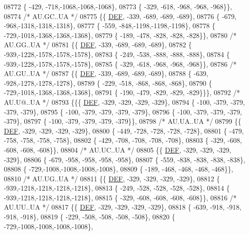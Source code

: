 \begin{DoxyCode}
08772 \{ -429, -718,-1068,-1068,-1068\},
08773 \{ -329, -618, -968, -968, -968\}\},
08774 \textcolor{comment}{/* AU.GC..UA */}
08775 \{\{  \mbox{\hyperlink{1_88_84__epars_8h_a397419fc12b37ed479c8abb9d444d843}{DEF}}, -339, -689, -689, -689\},
08776 \{ -679, -968,-1318,-1318,-1318\},
08777 \{ -559, -848,-1198,-1198,-1198\},
08778 \{ -729,-1018,-1368,-1368,-1368\},
08779 \{ -189, -478, -828, -828, -828\}\},
08780 \textcolor{comment}{/* AU.GG..UA */}
08781 \{\{  \mbox{\hyperlink{1_88_84__epars_8h_a397419fc12b37ed479c8abb9d444d843}{DEF}}, -339, -689, -689, -689\},
08782 \{ -939,-1228,-1578,-1578,-1578\},
08783 \{ -249, -538, -888, -888, -888\},
08784 \{ -939,-1228,-1578,-1578,-1578\},
08785 \{ -329, -618, -968, -968, -968\}\},
08786 \textcolor{comment}{/* AU.GU..UA */}
08787 \{\{  \mbox{\hyperlink{1_88_84__epars_8h_a397419fc12b37ed479c8abb9d444d843}{DEF}}, -339, -689, -689, -689\},
08788 \{ -639, -928,-1278,-1278,-1278\},
08789 \{ -229, -518, -868, -868, -868\},
08790 \{ -729,-1018,-1368,-1368,-1368\},
08791 \{ -190, -479, -829, -829, -829\}\}\},
08792 \textcolor{comment}{/* AU.U@..UA */}
08793 \{\{\{  \mbox{\hyperlink{1_88_84__epars_8h_a397419fc12b37ed479c8abb9d444d843}{DEF}}, -329, -329, -329, -329\},
08794 \{ -100, -379, -379, -379, -379\},
08795 \{ -100, -379, -379, -379, -379\},
08796 \{ -100, -379, -379, -379, -379\},
08797 \{ -100, -379, -379, -379, -379\}\},
08798 \textcolor{comment}{/* AU.UA..UA */}
08799 \{\{  \mbox{\hyperlink{1_88_84__epars_8h_a397419fc12b37ed479c8abb9d444d843}{DEF}}, -329, -329, -329, -329\},
08800 \{ -449, -728, -728, -728, -728\},
08801 \{ -479, -758, -758, -758, -758\},
08802 \{ -429, -708, -708, -708, -708\},
08803 \{ -329, -608, -608, -608, -608\}\},
08804 \textcolor{comment}{/* AU.UC..UA */}
08805 \{\{  \mbox{\hyperlink{1_88_84__epars_8h_a397419fc12b37ed479c8abb9d444d843}{DEF}}, -329, -329, -329, -329\},
08806 \{ -679, -958, -958, -958, -958\},
08807 \{ -559, -838, -838, -838, -838\},
08808 \{ -729,-1008,-1008,-1008,-1008\},
08809 \{ -189, -468, -468, -468, -468\}\},
08810 \textcolor{comment}{/* AU.UG..UA */}
08811 \{\{  \mbox{\hyperlink{1_88_84__epars_8h_a397419fc12b37ed479c8abb9d444d843}{DEF}}, -329, -329, -329, -329\},
08812 \{ -939,-1218,-1218,-1218,-1218\},
08813 \{ -249, -528, -528, -528, -528\},
08814 \{ -939,-1218,-1218,-1218,-1218\},
08815 \{ -329, -608, -608, -608, -608\}\},
08816 \textcolor{comment}{/* AU.UU..UA */}
08817 \{\{  \mbox{\hyperlink{1_88_84__epars_8h_a397419fc12b37ed479c8abb9d444d843}{DEF}}, -329, -329, -329, -329\},
08818 \{ -639, -918, -918, -918, -918\},
08819 \{ -229, -508, -508, -508, -508\},
08820 \{ -729,-1008,-1008,-1008,-1008\},

\end{DoxyCode}
